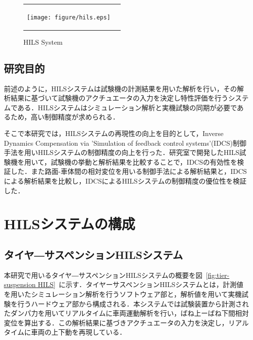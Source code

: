 \documentclass[a4paper,12pt]{article_vdlab_sotsuron}
\begin{document}

\vspace{10mm}
\begin{figure}[h!]
  \begin{tabular}{cc}
    \begin{minipage}{1.0\hsize}
      \begin{center}
	\texttt{[image: figure/hils.eps]}
	\caption{HILS System\cite{toyota_hils}}
	\label{fig:HILS system}
      \end{center}
     \end{minipage}
    \end{tabular}
\end{figure}

\subsection{研究目的}
前述のように，HILSシステムは試験機の計測結果を用いた解析を行い，その解析結果に基づいて試験機のアクチュエータの入力を決定し特性評価を行うシステムである．HILSシステムはシミュレーション解析と実機試験の同期が必要であるため，高い制御精度が求められる．

そこで本研究では，HILSシステムの再現性の向上を目的として，Inverse Dynamics Compensation via 'Simulation of feedback control systems'(IDCS)制御手法を用いHILSシステムの制御精度の向上を行った．研究室で開発したHILS試験機を用いて，試験機の挙動と解析結果を比較することで，IDCSの有効性を検証した．また路面-車体間の相対変位を用いる制御手法による解析結果と，IDCSによる解析結果を比較し，IDCSによるHILSシステムの制御精度の優位性を検証した．

\newpage
\section{HILSシステムの構成}
\subsection{タイヤ―サスペンションHILSシステム}
本研究で用いるタイヤ―サスペンションHILSシステムの概要を図~\ref{fig:tier-suspension HILS}~に示す．タイヤーサスペンションHILSシステムとは，計測値を用いたシミュレーション解析を行うソフトウェア部と，解析値を用いて実機試験を行うハードウェア部から構成される．本システムでは試験装置から計測されたダンパ力を用いてリアルタイムに車両運動解析を行い，ばね上ーばね下間相対変位を算出する．この解析結果に基づきアクチュエータの入力を決定し，リアルタイムに車両の上下動を再現している．
\end{document}
